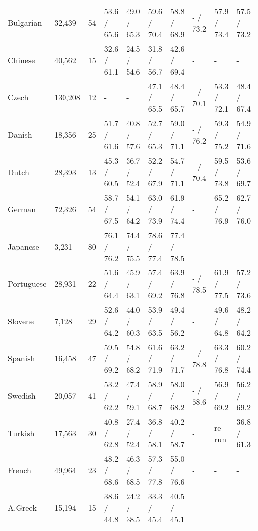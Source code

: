 \begin{landscape}
\begin{table}[ht]
\begin{tabular}{|l|l|l|p{2cm}|p{2cm}|p{2cm}|p{2cm}|p{2cm}|p{2cm}|p{2cm}|}
        Bulgarian  & 32,439  & 54   & 53.6 / 65.6   & 49.0 / 65.3   & 59.6 / 70.4   & 58.8 / 68.9   & - / 73.2    & 57.9 / 73.4     & 57.5 / 73.2 \\
        Chinese    & 40,562  & 15   & 32.6 / 61.1   & 24.5 / 54.6   & 31.8 / 56.7   & 42.6 / 69.4   & -           & -               & -           \\
        Czech      & 130,208 & 12   & -             & -            & 47.1 / 65.5   & 48.4 / 65.7    & - / 70.1    & 53.3 / 72.1     & 48.4 / 67.4 \\
        Danish     & 18,356  & 25   & 51.7 / 61.6   & 40.8 / 57.6   & 52.7 / 65.3   & 59.0 / 71.1   & - / 76.2    & 59.3 / 75.2     & 54.9 / 71.6 \\
        Dutch      & 28,393  & 13   & 45.3 / 60.5   & 36.7 / 52.4   & 52.2 / 67.9   & 54.7 / 71.1   & - / 70.4    & 59.5 / 73.8     & 53.6 / 69.7 \\
        German     & 72,326  & 54   & 58.7 / 67.5   & 54.1 / 64.2   & 63.0 / 73.9   & 61.9 / 74.4   & -           & 65.2 / 76.9     & 62.7 / 76.0 \\
        Japanese   & 3,231   & 80   & 76.1 / 76.2   & 74.4 / 75.5   & 78.6 / 77.4   & 77.4 / 78.5   & -           & -               & -           \\
        Portuguese & 28,931  & 22   & 51.6 / 64.4   & 45.9 / 63.1   & 57.4 / 69.2   & 63.9 / 76.8   & - / 78.5    & 61.9 / 77.5     & 57.2 / 73.6 \\
        Slovene    & 7,128   & 29   & 52.6 / 64.2   & 44.0 / 60.3   & 53.9 / 63.5   & 49.4 / 56.2   & -           & 49.6 / 64.8     & 48.2 / 64.2 \\
        Spanish    & 16,458  & 47   & 59.5 / 69.2   & 54.8 / 68.2   & 61.6 / 71.9   & 63.2 / 71.7   & - / 78.8    & 63.3 / 76.8     & 60.2 / 74.4 \\
        Swedish    & 20,057  & 41   & 53.2 / 62.2   & 47.4 / 59.1   & 58.9 / 68.7   & 58.0 / 68.2   & - / 68.6     & 56.9 / 69.2      & 56.2 / 69.2 \\
        Turkish    & 17,563  & 30   & 40.8 / 62.8   & 27.4 / 52.4   & 36.8 / 58.1   & 40.2 / 58.7   & -           & re-run          & 36.8 / 61.3  \\ \hline %
        French     & 49,964  & 23   & 48.2 / 68.6   & 46.3 / 68.5   & 57.3 / 77.8   & 55.0 / 76.6   & -           & -               & -        \\
        A.Greek    & 15,194  & 15   & 38.6 / 44.8   & 24.2 / 38.5   & 33.3 / 45.4  & 40.5 / 45.1    & -           & -               & -        \\ \hline
    \end{tabular}
\end{table}
\end{landscape}
